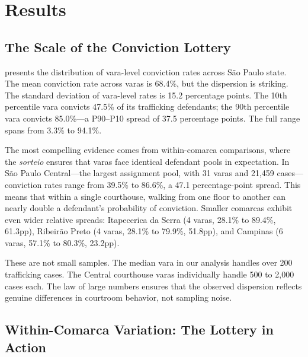 \documentclass[12pt]{article}
\begin{document}
\section{Results}

\subsection{The Scale of the Conviction Lottery}



 presents the distribution of vara-level conviction rates across S\~ao Paulo state. The mean conviction rate across varas is 68.4\%, but the dispersion is striking. The standard deviation of vara-level rates is 15.2 percentage points. The 10th percentile vara convicts 47.5\% of its trafficking defendants; the 90th percentile vara convicts 85.0\%---a P90--P10 spread of 37.5 percentage points. The full range spans from 3.3\% to 94.1\%.

The most compelling evidence comes from within-comarca comparisons, where the \textit{sorteio} ensures that varas face identical defendant pools in expectation. In S\~ao Paulo Central---the largest assignment pool, with 31 varas and 21,459 cases---conviction rates range from 39.5\% to 86.6\%, a 47.1 percentage-point spread. This means that within a single courthouse, walking from one floor to another can nearly double a defendant's probability of conviction. Smaller comarcas exhibit even wider relative spreads: Itapecerica da Serra (4 varas, 28.1\% to 89.4\%, 61.3pp), Ribeir\~ao Preto (4 varas, 28.1\% to 79.9\%, 51.8pp), and Campinas (6 varas, 57.1\% to 80.3\%, 23.2pp).

These are not small samples. The median vara in our analysis handles over 200 trafficking cases. The Central courthouse varas individually handle 500 to 2,000 cases each. The law of large numbers ensures that the observed dispersion reflects genuine differences in courtroom behavior, not sampling noise.

\subsection{Within-Comarca Variation: The Lottery in Action}


\end{document}
